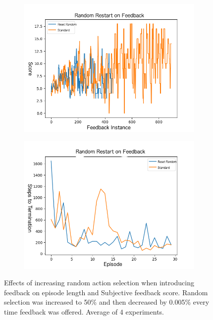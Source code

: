 \documentclass{article}
\begin{document}
\begin{figure}[t]
  \centering
  \begin{subfigure}{.5\textwidth}
    \includegraphics[width=\linewidth]{randomrestartSCORE.png}
  \end{subfigure}
  \begin{subfigure}{.5\textwidth}
    \includegraphics[width=\linewidth]{randomrestartEP.png}
  \end{subfigure}
\caption{Effects of increasing random action selection when introducing feedback on episode length and Subjective feedback score. Random selection was increased to 50\% and then decreased by 0.005\% every time feedback was offered. Average of 4 experiments.}
\label{fig:random_example}
\end{figure}
\end{document}
